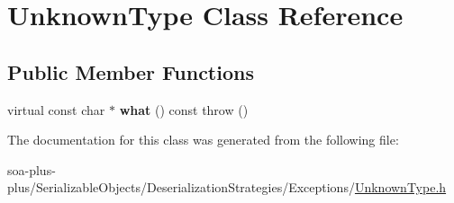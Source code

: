 \hypertarget{class_unknown_type}{
\section{UnknownType Class Reference}
\label{class_unknown_type}
}
\subsection*{Public Member Functions}
\begin{DoxyCompactItemize}
\item 
\hypertarget{class_unknown_type_aa72008b7a92ed2e93fa50b02a1b7078d}{
virtual const char $\ast$ {\bfseries what} () const   throw ()}
\label{class_unknown_type_aa72008b7a92ed2e93fa50b02a1b7078d}

\end{DoxyCompactItemize}


The documentation for this class was generated from the following file:\begin{DoxyCompactItemize}
\item 
soa-\/plus-\/plus/SerializableObjects/DeserializationStrategies/Exceptions/\hyperlink{_unknown_type_8h}{UnknownType.h}\end{DoxyCompactItemize}

